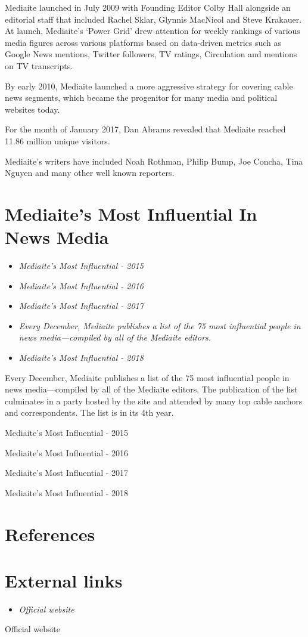 Mediaite launched in July 2009 with Founding Editor Colby Hall alongside
an editorial staff that included Rachel Sklar, Glynnis MacNicol and
Steve Krakauer. At launch, Mediaite's `Power Grid' drew attention for
weekly rankings of various media figures across various platforms based
on data-driven metrics such as Google News mentions, Twitter followers,
TV ratings, Circulation and mentions on TV transcripts.

By early 2010, Mediaite launched a more aggressive strategy for covering
cable news segments, which became the progenitor for many media and
political websites today.

For the month of January 2017, Dan Abrams revealed that Mediaite reached
11.86 million unique visitors.

Mediaite's writers have included Noah Rothman, Philip Bump, Joe Concha,
Tina Nguyen and many other well known reporters.

\section{Mediaite's Most Influential In News
Media}\label{mediaites-most-influential-in-news-media}

\begin{itemize}
\item
  \emph{Mediaite's Most Influential - 2015}
\item
  \emph{Mediaite's Most Influential - 2016}
\item
  \emph{Mediaite's Most Influential - 2017}
\item
  \emph{Every December, Mediaite publishes a list of the 75 most
  influential people in news media---compiled by all of the Mediaite
  editors.}
\item
  \emph{Mediaite's Most Influential - 2018}
\end{itemize}

Every December, Mediaite publishes a list of the 75 most influential
people in news media---compiled by all of the Mediaite editors. The
publication of the list culminates in a party hosted by the site and
attended by many top cable anchors and correspondents. The list is in
its 4th year.

Mediaite's Most Influential - 2015

Mediaite's Most Influential - 2016

Mediaite's Most Influential - 2017

Mediaite's Most Influential - 2018

\section{References}\label{references}

\section{External links}\label{external-links}

\begin{itemize}
\item
  \emph{Official website}
\end{itemize}

Official website
